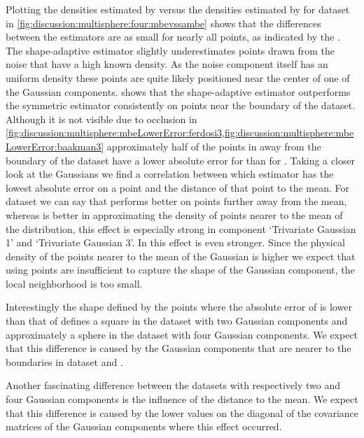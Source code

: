 	Plotting the densities estimated by \sambe versus the densities estimated by \mbe for dataset \baakmanFive in \cref{fig:discussion:multisphere:four:mbevssambe} shows that the differences between the estimators are as small for nearly all points, as indicated by the \mse. The shape-adaptive estimator slightly underestimates points drawn from the noise that have a high known density. As the noise component itself has an uniform density these points are quite likely positioned near the center of one of the Gaussian components. 
	 shows that the shape-adaptive estimator outperforms the symmetric estimator consistently on points near the boundary of the dataset. Although it is not visible due to occlusion in \cref{fig:discussion:multisphere:mbeLowerError:ferdosi3,fig:discussion:multisphere:mbeLowerError:baakman3} approximately half of the points in away from the boundary of the dataset have a lower absolute error for \sambe than for \mbe. Taking a closer look at the Gaussians we find a correlation between which estimator has the lowest absolute error on a point and the distance of that point to the mean. For dataset \ferdosiThree we can say that \sambe performs better on points further away from the mean, whereas \mbe is better in approximating the density of points nearer to the mean of the distribution, this effect is especially strong in component `Trivariate Gaussian 1' and `Trivariate Gaussian 3'. In \baakmanThree this effect is even stronger. Since the physical density of the points nearer to the mean of the Gaussian is higher we expect that using \KNNK points are insufficient to capture the shape of the Gaussian component, \ie the local neighborhood is too small. 

	Interestingly the shape defined by the points where the absolute error of \mbe is lower than that of \sambe defines a square in the dataset with two Gaussian components and approximately a sphere in the dataset with four Gaussian components. We expect that this difference is caused by the Gaussian components that are nearer to the boundaries in dataset \ferdosiThree and \baakmanThree. 

	Another fascinating difference between the datasets with respectively two and four Gaussian components is the influence of the distance to the mean. We expect that this difference is caused by the lower values on the diagonal of the covariance matrices of the Gaussian components where this effect occurred. 

